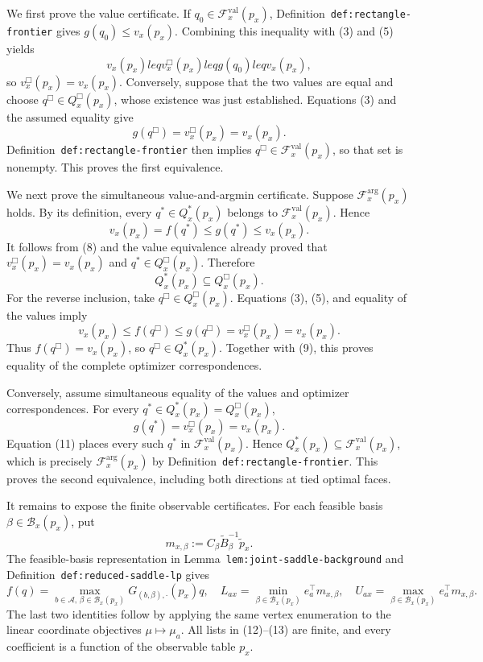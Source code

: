 We first prove the value certificate.  If \(q_0\in\mathcal F_x^{\mathrm{val}}(p_x)\), Definition~\texttt{def:rectangle-frontier} gives \(g(q_0)\leq v_x(p_x)\).  Combining this inequality with (3) and (5) yields
\[
 v_x(p_x)leq v_x^{\Box}(p_x)leq g(q_0)leq v_x(p_x),
\tag{6}
\]
so \(v_x^{\Box}(p_x)=v_x(p_x)\).  Conversely, suppose that the two values are equal and choose \(q^{\Box}\in Q_x^{\Box}(p_x)\), whose existence was just established.  Equations (3) and the assumed equality give
\[
 g(q^{\Box})=v_x^{\Box}(p_x)=v_x(p_x).
\tag{7}
\]
Definition~\texttt{def:rectangle-frontier} then implies \(q^{\Box}\in\mathcal F_x^{\mathrm{val}}(p_x)\), so that set is nonempty.  This proves the first equivalence.

We next prove the simultaneous value-and-argmin certificate.  Suppose \(\mathcal F_x^{\mathrm{arg}}(p_x)\) holds.  By its definition, every \(q^*\in Q_x^*(p_x)\) belongs to \(\mathcal F_x^{\mathrm{val}}(p_x)\).  Hence
\[
 v_x(p_x)=f(q^*)\leq g(q^*)\leq v_x(p_x).
\tag{8}
\]
It follows from (8) and the value equivalence already proved that \(v_x^{\Box}(p_x)=v_x(p_x)\) and \(q^*\in Q_x^{\Box}(p_x)\).  Therefore
\[
 Q_x^*(p_x)\subseteq Q_x^{\Box}(p_x).
\tag{9}
\]
For the reverse inclusion, take \(q^{\Box}\in Q_x^{\Box}(p_x)\).  Equations (3), (5), and equality of the values imply
\[
 v_x(p_x)\leq f(q^{\Box})\leq g(q^{\Box})
 =v_x^{\Box}(p_x)=v_x(p_x).
\tag{10}
\]
Thus \(f(q^{\Box})=v_x(p_x)\), so \(q^{\Box}\in Q_x^*(p_x)\).  Together with (9), this proves equality of the complete optimizer correspondences.

Conversely, assume simultaneous equality of the values and optimizer correspondences.  For every \(q^*\in Q_x^*(p_x)=Q_x^{\Box}(p_x)\),
\[
 g(q^*)=v_x^{\Box}(p_x)=v_x(p_x).
\tag{11}
\]
Equation (11) places every such \(q^*\) in \(\mathcal F_x^{\mathrm{val}}(p_x)\).  Hence \(Q_x^*(p_x)\subseteq\mathcal F_x^{\mathrm{val}}(p_x)\), which is precisely \(\mathcal F_x^{\mathrm{arg}}(p_x)\) by Definition~\texttt{def:rectangle-frontier}.  This proves the second equivalence, including both directions at tied optimal faces.

It remains to expose the finite observable certificates.  For each feasible basis \(\beta\in\mathcal B_x(p_x)\), put
\[
 m_{x,\beta}:=C_\beta\widetilde B_\beta^{-1}\widetilde p_x.
\tag{12}
\]
The feasible-basis representation in Lemma~\texttt{lem:joint-saddle-background} and Definition~\texttt{def:reduced-saddle-lp} gives
\[
 f(q)=\max_{b\in\mathcal A,\,\beta\in\mathcal B_x(p_x)}
 G_{(b,\beta),\cdot}(p_x)q,
\quad
 L_{ax}=\min_{\beta\in\mathcal B_x(p_x)}e_a^\top m_{x,\beta},
\quad
 U_{ax}=\max_{\beta\in\mathcal B_x(p_x)}e_a^\top m_{x,\beta}.
\tag{13}
\]
The last two identities follow by applying the same vertex enumeration to the linear coordinate objectives \(\mu\mapsto\mu_a\).  All lists in (12)--(13) are finite, and every coefficient is a function of the observable table \(p_x\).

